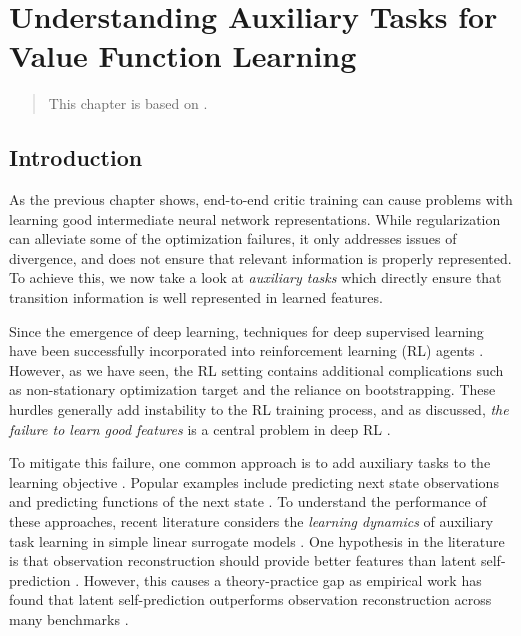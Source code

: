 \chapter{Understanding Auxiliary Tasks for Value Function Learning}
\label{chap:understanding}

\begin{quote}
    This chapter is based on .
\end{quote}

\section{Introduction}

As the previous chapter shows, end-to-end critic training can cause problems with learning good intermediate neural network representations.
While regularization can alleviate some of the optimization failures, it only addresses issues of divergence, and does not ensure that relevant information is properly represented.
To achieve this, we now take a look at \emph{auxiliary tasks} which directly ensure that transition information is well represented in learned features.

Since the emergence of deep learning, techniques for deep supervised learning have been successfully incorporated into reinforcement learning (RL) agents \parencite{dqn,ddpg}.
However, as we have seen, the RL setting contains additional complications such as non-stationary optimization target and the reliance on bootstrapping.
These hurdles generally add instability to the RL training process, and as discussed, \emph{the failure to learn good features} is a central problem in deep RL \parencite{kumar2021implicit,lyle2022understanding,nikishin2022primacy,hussing2024dissecting}.

To mitigate this failure, one common approach is to add auxiliary tasks to the learning objective \parencite{jaderberg2017reinforcement}. 
Popular examples include predicting next state observations \parencite{jaderberg2016reinforcement} and predicting functions of the next state \parencite{schwarzer2021dataefficient,ni2024bridging}.
To understand the performance of these approaches, recent literature \parencite{tang2022understanding,lelan2023bootstrapped} considers the \emph{learning dynamics} of auxiliary task learning in simple linear surrogate models \parencite{saxe2014exact}.
One hypothesis in the literature is that observation reconstruction should provide better features than latent self-prediction \parencite{behzadian2019fast,tang2022understanding}. 
However, this causes a theory-practice gap as empirical work has found that latent self-prediction outperforms observation reconstruction across many benchmarks \parencite{schwarzer2021dataefficient,ni2024bridging}.

